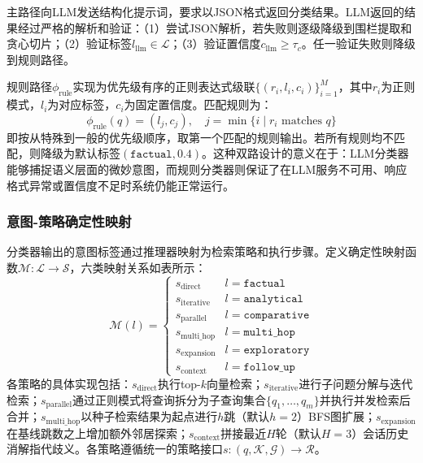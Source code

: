 \documentclass[runningheads]{llncs}
\begin{document}
主路径向LLM发送结构化提示词，要求以JSON格式返回分类结果。LLM返回的结果经过严格的解析和验证：（1）尝试JSON解析，若失败则逐级降级到围栏提取和贪心切片；（2）验证标签$l_{\text{llm}} \in \mathcal{L}$；（3）验证置信度$c_{\text{llm}} \geq \tau_c$。任一验证失败则降级到规则路径。

规则路径$\phi_{\text{rule}}$实现为优先级有序的正则表达式级联$\{(r_i, l_i, c_i)\}_{i=1}^{M}$，其中$r_i$为正则模式，$l_i$为对应标签，$c_i$为固定置信度。匹配规则为：
\begin{equation}
    \phi_{\text{rule}}(q) = (l_j, c_j), \quad j = \min\{i \mid r_i \text{ matches } q\}
\end{equation}
即按从特殊到一般的优先级顺序，取第一个匹配的规则输出。若所有规则均不匹配，则降级为默认标签$(\texttt{factual}, 0.4)$。这种双路设计的意义在于：LLM分类器能够捕捉语义层面的微妙意图，而规则分类器则保证了在LLM服务不可用、响应格式异常或置信度不足时系统仍能正常运行。

\subsubsection{意图-策略确定性映射}

分类器输出的意图标签通过推理器映射为检索策略和执行步骤。定义确定性映射函数$\mathcal{M}: \mathcal{L} \to \mathcal{S}$，六类映射关系如表所示：
\begin{equation}
    \mathcal{M}(l) = \begin{cases}
    s_{\text{direct}} & l = \texttt{factual} \\
    s_{\text{iterative}} & l = \texttt{analytical} \\
    s_{\text{parallel}} & l = \texttt{comparative} \\
    s_{\text{multi\_hop}} & l = \texttt{multi\_hop} \\
    s_{\text{expansion}} & l = \texttt{exploratory} \\
    s_{\text{context}} & l = \texttt{follow\_up}
    \end{cases}
\end{equation}
各策略的具体实现包括：$s_{\text{direct}}$执行top-$k$向量检索；$s_{\text{iterative}}$进行子问题分解与迭代检索；$s_{\text{parallel}}$通过正则模式将查询拆分为子查询集合$\{q_1, \ldots, q_m\}$并执行并发检索后合并；$s_{\text{multi\_hop}}$以种子检索结果为起点进行$h$跳（默认$h=2$）BFS图扩展；$s_{\text{expansion}}$在基线跳数之上增加额外邻居探索；$s_{\text{context}}$拼接最近$H$轮（默认$H=3$）会话历史消解指代歧义。各策略遵循统一的策略接口$s: (q, \mathcal{K}, \mathcal{G}) \to \mathcal{R}$。
\end{document}
